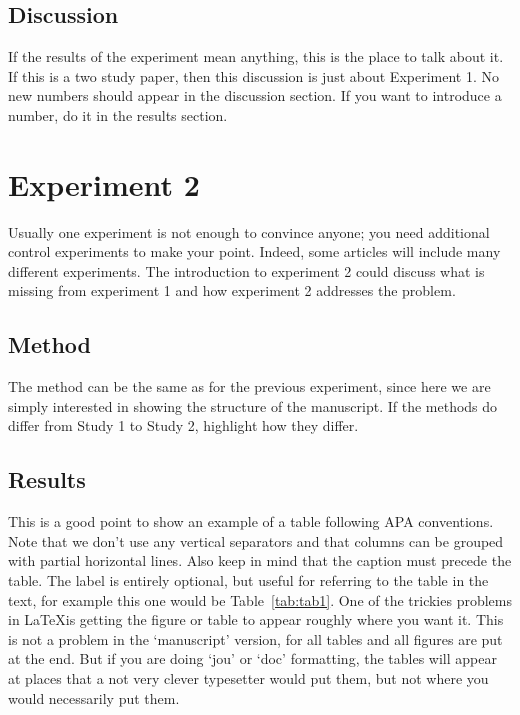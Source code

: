 \documentclass[doc]{apa}%
\begin{document}
\subsection{Discussion}
If the results of the experiment mean anything, this is the place to talk about it.  If this is a two study paper, then this discussion is just about Experiment 1. No new numbers should appear in the discussion section. If you want to introduce a number, do it in the results section.

\section{Experiment 2}
Usually one experiment is not enough to convince anyone; you need additional control experiments to make your point.  Indeed, some articles will include many different experiments. %
The introduction to experiment 2 could discuss what is missing from experiment 1 and how experiment 2 addresses the problem.


\subsection{Method}
The method can be the same as for the previous experiment, since here we are simply interested in showing the structure of the manuscript.  %
If the methods do differ from Study 1 to Study 2, highlight how they differ.
\subsection{Results}
This is a good point to show an example of a table following APA conventions. Note that we don't use any vertical separators and that columns can be grouped with partial horizontal lines.  
Also keep in mind that the caption must precede the table. The label is entirely optional, but useful for referring to the table in the text, for example this one would be Table~\ref{tab:tab1}. One of the trickies problems in \LaTeX is getting the figure or table to appear roughly where you want it.  This is not a problem in the `manuscript' version, for all tables and all figures are put at the end.  But if you are doing `jou' or `doc' formatting, the tables will appear at places that a not very clever  typesetter would put them, but not where you would necessarily put them.
\end{document}

